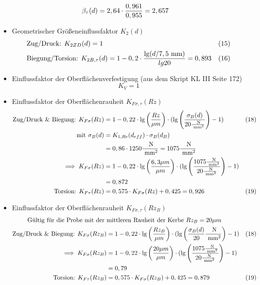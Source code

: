 \begin{itemize}
\begin{align*}
	&\beta_{ \tau} (d)= 2,64 \cdot \frac{0,961}{0,955}  =2,657
	\end{align*}
\item Geometrischer Größeneinflussfaktor $K_2 (d)$ 
	\begin{align*}
	&\text{Zug/Druck: }K_{2ZD} (d) = 1 & (15) \\
	&\text{Biegung/Torsion: } K_{2B,\tau} (d) = 1 -0,2 \cdot  \frac{\lg (d / 7,5 \text{ mm})}{lg 20}  = 0,893 &(16) 
	\end{align*}
\item Einflussfaktor der Oberflächenverfestigung (aus dem Skript KL III  Seite 172)
	\[
	K_{V} = 1
	\]
\item Einflussfaktor der Oberflächenrauheit $K_{F\sigma, \tau} (Rz)$
	\begin{align*}
	\text{Zug/Druck \& Biegung: } K_{F\sigma} (Rz)&= 1 - 0,22 \cdot \lg \left( \frac{Rz}{\mu m}\right) \cdot ( \lg \left( \frac{\sigma_B (d)}{20\frac{\text{ N}}{\text{ mm}^2}}\right) -1 ) &(18) \\
	\text{mit } \sigma_B (d) &= K_{1,Re} (d_{eff}) \cdot \sigma_B (d_B) \\
	&= 0,86 \cdot 1250\frac{\text{ N}}{\text{ mm}^2} = 1075 \frac{\text{ N}}{\text{ mm}^2} \\
	\implies K_{F\sigma} (Rz) & = 1 - 0,22 \cdot \lg \left( \frac{6,3 \mu m}{\mu m}\right) \cdot ( \lg \left( \frac{1075\frac{\text{ N}}{\text{ mm}^2} }{20\frac{\text{ N}}{\text{ mm}^2}}\right) -1 ) \\
	 &= 0,872 \\
	\text{Torsion: } K_{F\tau} (Rz)&= 0,575 \cdot K_{F\sigma} (Rz) +0,425 = 0,926 & (19) 
	\end{align*}
\item Einflussfaktor der Oberflächenrauheit $K_{F\sigma, \tau} (Rz_B)$
	\begin{align*}
	\text{Gültig für die Probe mit der } &\text{mittleren Rauheit der Kerbe } Rz_B= 20 \mu m\\
	\text{Zug/Druck \& Biegung: } K_{F\sigma} (Rz_B)&= 1 - 0,22 \x \lg \left( \frac{Rz_B}{\mu m}\right) \x ( \lg \left( \frac{\sigma_B (d)}{20}\frac{\text{ N}}{\text{ mm}^2}\right) -1 ) &(18) \\
	\implies K_{F\sigma} (Rz_B) & = 1 - 0,22 \x \lg \left( \frac{20 \mu m}{\mu m}\right) \x ( \lg \left( \frac{1075\frac{\text{ N}}{\text{ mm}^2} }{20\frac{\text{ N}}{\text{ mm}^2}}\right) -1 )\\
	&= 0,79 \\
	\text{Torsion: } K_{F\tau} (Rz_B)&= 0,575 \x K_{F\sigma} (Rz_B) +0,425 = 0,879 & (19) 

\end{align*}
\end{itemize}
